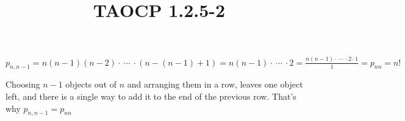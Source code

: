 \documentclass{article}
\title{TAOCP 1.2.5\mbox{-}2}
\begin{document}
\maketitle

\( p_{n,n-1} = n(n-1)(n-2) \cdot\ \cdots\ \cdot (n-(n-1)+1) = n(n-1) \cdot\ \cdots\ \cdot 2 = \frac{n(n-1) \cdot\ \cdots\ \cdot 2 \cdot 1}{1} = p_{nn} = n! \)

Choosing \( n - 1 \) objects out of \( n \) and arranging them in a row, leaves one object left, and there is a single way to add it to the end of the previous row. That's why \( p_{n,n-1} = p_{nn} \)
\end{document}
